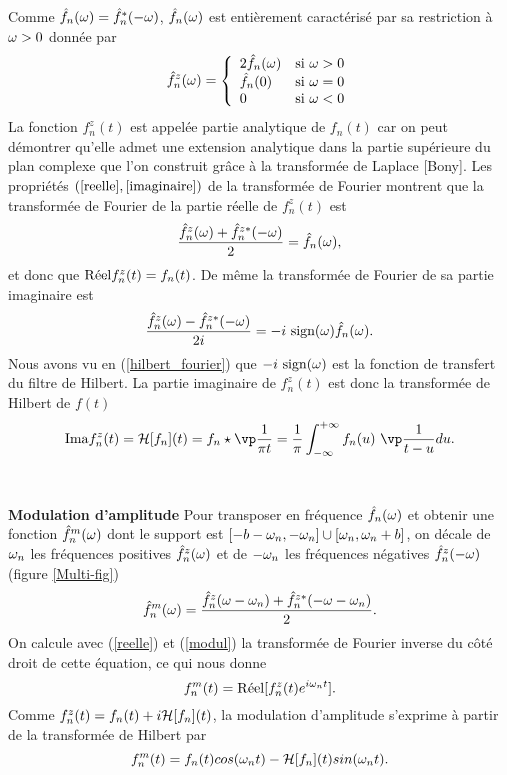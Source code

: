 Comme $\hat f_n({\omega}) = \hat f_n^*(-{\omega})$, $\hat f_n({\omega})$ est
enti\`erement caract\'eris\'e par sa restriction \`a ${\omega} > 0$
donn\'ee par
\begin{equation} 
\hat f_n^z ( {\omega} ) = 
   \left \{ \begin{array}{ll} 
            2 \hat f_n ( {\omega} ) & \mbox{si ${\omega} > 0$}\\
            \hat f_n ( 0 ) & \mbox{si ${\omega} = 0$}\\
            0 & \mbox{si $ {\omega} < 0$}
            \end{array}
   \right.  
\end{equation}
La fonction
$f_n^z (t)$ est appel\'ee partie analytique de $f_n(t)$
car on peut d\'emontrer
qu'elle admet une extension analytique dans la partie sup\'erieure
du plan complexe que l'on construit gr\^ace \`a la transform\'ee
de Laplace [Bony]. 
Les propri\'et\'es $(\ref{reelle},\ref{imaginaire})$ de
la transform\'ee de Fourier montrent que 
la transform\'ee de Fourier de la partie r\'eelle de
$f^z_n (t)$ est
\[
\frac {\hat f_n^z ( {\omega} ) + \hat f_n^{z*} ( - {\omega} )} 2 = \hat f_n({\omega}) ,
\]
et donc que ${\rm R\acute{e}el}  f_n^z (t) = f_n(t)$. De m\^eme
la transform\'ee de Fourier de sa partie imaginaire est
\begin{equation} 
\frac {\hat f_n^z ( {\omega} ) - \hat f_n^{z*} ( - {\omega} )} {2 i} 
= -i ~\mbox{sign} ( {\omega} ) \hat f_n ( {\omega} ).
\end{equation} 
Nous avons vu en (\ref{hilbert_fourier}) que 
$-i ~{\rm sign} ( {\omega} )$ est la fonction de transfert du
filtre de Hilbert.
La partie imaginaire de $f_n^z (t)$ est donc la transform\'ee
de Hilbert de $f(t)$
\begin{equation} 
\Ima f_n^z (t) = {\cal H}[ f_n] (t) = 
f_n \star \vp \frac 1 {\pi t } = 
\frac 1 \pi \int_{- \infty}^{+ \infty} 
{f_n( u )} ~\vp \frac 1 {t - u} d u .
\end{equation} 
\\
\\
{\bf Modulation d'amplitude}
Pour transposer en fr\'equence $\hat f_n ({\omega})$ 
et obtenir une fonction
$ \hat f_n^m ( {\omega})$ dont le support est 
$[-b-{\omega}_n,-{\omega}_n] \cup [{\omega}_n,{\omega}_n+b]$, on
d\'ecale de ${\omega}_n$ les
fr\'equences positives $\hat f_n^z ({\omega})$ et de $-{\omega}_n$
les fr\'equences n\'egatives $\hat f_n^z(-{\omega})$ (figure \ref{Multi-fig})
\begin{equation} 
\hat f^m_n ({\omega} ) = \frac {\hat f^z_n( {\omega} - {\omega}_n ) + 
\hat f^{z *}_n( - {\omega} - {\omega}_n )} 2 .
\end{equation} 
On calcule avec (\ref{reelle}) et (\ref{modul}) la
transform\'ee de Fourier inverse du c\^ot\'e droit
de cette \'equation, ce qui nous donne
\begin{equation} 
f^m_n (t) = {\rm R\acute{e}el} [ f_n^z (t) e^{i {\omega}_n t} ] .
\end{equation} 
Comme $f_n^z (t) = f_n(t) + i {\cal H}[f_n](t)$, 
la modulation d'amplitude s'exprime \`a partir de la
transform\'ee de Hilbert par
\begin{equation} 
\label{modulation-amplitude}
f^m_n(t) = f_n(t) cos ({\omega}_n t) - {\cal H} [f_n] (t) sin ({\omega}_n t) .
\end{equation} 



